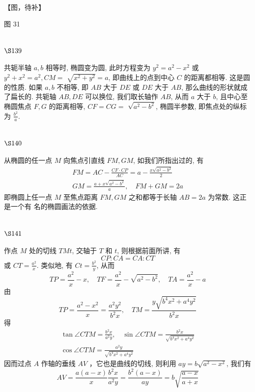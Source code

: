 【图，待补】

图 31

\section{$\S 139$}

共轭半轴 $a, b$ 相等时, 椭圆变为圆, 此时方程变为 $y^{2}=a^{2}-x^{2}$ 或 $y^{2}+x^{2}=a^{2}, C M=$ $\sqrt{x^{2}+y^{2}}=a$, 即曲线上的点到中心 $C$ 的距离都相等. 这是圆的性质. 如果 $a, b$ 不相等, 即 $A B$ 大于 $D E$ 或 $D E$ 大于 $A B$, 那么曲线的形状就成了扁长的. 共轭轴 $A B, D E$ 可以换位, 我们取长轴作 $A B$, 从而 $a$ 大于 $b$, 且中心至椭圆焦点 $F, G$ 的距离相等, $C F=C G=$ $\sqrt{a^{2}-b^{2}}$, 椭圆半参数, 即焦点处的纵标为 $\frac{b^{2}}{a}$.

\section{$\S 140$}

从椭圆的任一点 $M$ 向焦点引直线 $F M, G M$, 如我们所指出过的, 有
\[
\begin{gathered}
F M=A C-\frac{C F \cdot C P}{A C}=a-\frac{x \sqrt{a^{2}-b^{2}}}{2} \\
G M=\frac{a+x \sqrt{a^{2}-b^{2}}}{a}, \quad F M+G M=2 a
\end{gathered}
\]
即椭圆上任一点 $M$ 至焦点距离 $F M, G M$ 之和都等于长轴 $A B=2 a$ 为常数. 这正是一个有 名的椭圆画法的依据.

\section{$\S 141$}

作点 $M$ 处的切线 $T M t$, 交轴于 $T$ 和 $t$, 则根据前面所讲, 有
\[
C P: C A=C A: C T
\]
或 $C T=\frac{a^{2}}{x}$. 类似地, 有 $C t=\frac{b^{2}}{y}$, 从而
\[
T P=\frac{a^{2}}{x}-x, \quad T F=\frac{a^{2}}{x}-\sqrt{a^{2}-b^{2}}, \quad T A=\frac{a^{2}}{x}-a
\]
由
\[
T P=\frac{a^{2}-x^{2}}{x}=\frac{a^{2} y^{2}}{b^{2} x}, \quad T M=\frac{y \sqrt{b^{4} x^{2}+a^{4} y^{2}}}{b^{2} x}
\]
得
\[
\begin{gathered}
\tan \angle C T M=\frac{b^{2} x}{a^{2} y}, \quad \sin \angle C T M=\frac{b^{2} x}{\sqrt{b^{4} x^{2}+a^{4} y^{2}}} \\
\cos \angle C T M=\frac{a^{2} y}{\sqrt{b^{4} x^{2}+a^{4} y^{2}}}
\end{gathered}
\]
因而过点 $A$ 作轴的垂线 $A V$ ，它也是曲线的切线, 则利用 $a y=b \sqrt{a^{2}-x^{2}}$, 我们有
\[
A V=\frac{a(a-x)}{x} \frac{b^{2} x}{a^{2} y}=\frac{b^{2}(a-x)}{a y}=b \sqrt{\frac{a-x}{a+x}}
\]
